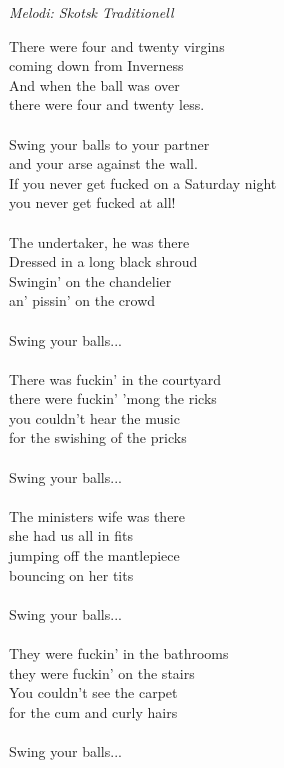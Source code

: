 {\footnotesize\textit{Melodi: Skotsk Traditionell}}\par
\vspace{10pt}
There were four and twenty virgins\\
coming down from Inverness\\
And when the ball was over\\
there were four and twenty less.\\
\\
Swing your balls to your partner\\
and your arse against the wall.\\
If you never get fucked on a Saturday night\\
you never get fucked at all!\\
\\
The undertaker, he was there\\
Dressed in a long black shroud\\
Swingin' on the chandelier\\
an' pissin' on the crowd\\
\\
Swing your balls...\\
\\
There was fuckin' in the courtyard\\
there were fuckin' 'mong the ricks\\
you couldn't hear the music\\
for the swishing of the pricks\\
\\
Swing your balls...\\
\\
The ministers wife was there\\
she had us all in fits\\
jumping off the mantlepiece\\
bouncing on her tits\\
\\
Swing your balls...\\
\\
They were fuckin' in the bathrooms\\
they were fuckin' on the stairs\\
You couldn't see the carpet \\
for the cum and curly hairs\\
\\
Swing your balls...\\
\\
